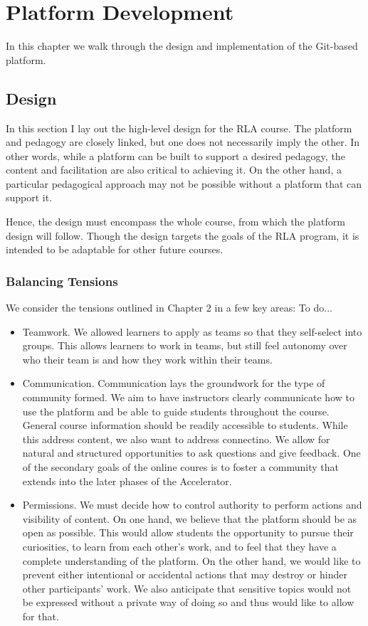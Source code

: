 \documentclass[12pt,twoside,vi]{mitthesis}
\newcommand{\wip}[1]{{\color{red} To do...}}
\begin{document}
\chapter{Platform Development}

In this chapter we walk through the design and implementation of the Git-based platform. 

\section{Design}

In this section I lay out the high-level design for the RLA course. The platform and pedagogy are closely linked, but one does not necessarily imply the other. In other words, while a platform can be built to support a desired pedagogy, the content and facilitation are also critical to achieving it. On the other hand, a particular pedagogical approach may not be possible without a platform that can support it. 

Hence, the design must encompass the whole course, from which the platform design will follow. Though the design targets the goals of the RLA program, it is intended to be adaptable for other future courses.

\subsection{Balancing Tensions}

We consider the tensions outlined in Chapter 2 in a few key areas:
\wip{restructure subsection in terms of tensions instead of new areas}
\begin{itemize}
\item Teamwork. We allowed learners to apply as teams so that they self-select into groups. This allows learners to work in teams, but still feel autonomy over who their team is and how they work within their teams.
\item Communication. Communication lays the groundwork for the type of community formed. We aim to have instructors clearly communicate how to use the platform and be able to guide students throughout the course. General course information should be readily accessible to students. While this address content, we also want to address connectino. We allow for natural and structured opportunities to ask questions and give feedback. One of the secondary goals of the online coures is to foster a community that extends into the later phases of the Accelerator.
\item Permissions. We must decide how to control authority to perform actions and visibility of content. On one hand, we believe that the platform should be as open as possible. This would allow students the opportunity to pursue their curiosities, to learn from each other's work, and to feel that they have a complete understanding of the platform. On the other hand, we would like to prevent either intentional or accidental actions that may destroy or hinder other participants' work. We also anticipate that sensitive topics would not be expressed without a private way of doing so and thus would like to allow for that.
\end{itemize}
\end{document}
